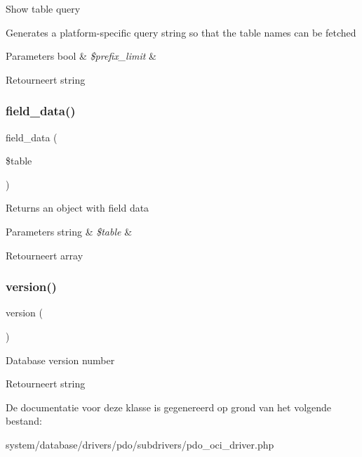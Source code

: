 Show table query

Generates a platform-\/specific query string so that the table names can be fetched


\begin{DoxyParams}[1]{Parameters}
bool & {\em \$prefix\+\_\+limit} & \\
\hline
\end{DoxyParams}
\begin{DoxyReturn}{Retourneert}
string 
\end{DoxyReturn}
\mbox{\label{class_c_i___d_b__pdo__oci__driver_a90355121e1ed009e0efdbd544ab56efa}} 
\subsubsection{\texorpdfstring{field\_data()}{field\_data()}}
{\footnotesize\ttfamily field\+\_\+data (\begin{DoxyParamCaption}\item[{}]{\$table }\end{DoxyParamCaption})}

Returns an object with field data


\begin{DoxyParams}[1]{Parameters}
string & {\em \$table} & \\
\hline
\end{DoxyParams}
\begin{DoxyReturn}{Retourneert}
array 
\end{DoxyReturn}
\mbox{\label{class_c_i___d_b__pdo__oci__driver_a6080dae0886626b9a4cedb29240708b1}} 
\subsubsection{\texorpdfstring{version()}{version()}}
{\footnotesize\ttfamily version (\begin{DoxyParamCaption}{ }\end{DoxyParamCaption})}

Database version number

\begin{DoxyReturn}{Retourneert}
string 
\end{DoxyReturn}


De documentatie voor deze klasse is gegenereerd op grond van het volgende bestand\+:\begin{DoxyCompactItemize}
\item 
system/database/drivers/pdo/subdrivers/pdo\+\_\+oci\+\_\+driver.\+php\end{DoxyCompactItemize}

